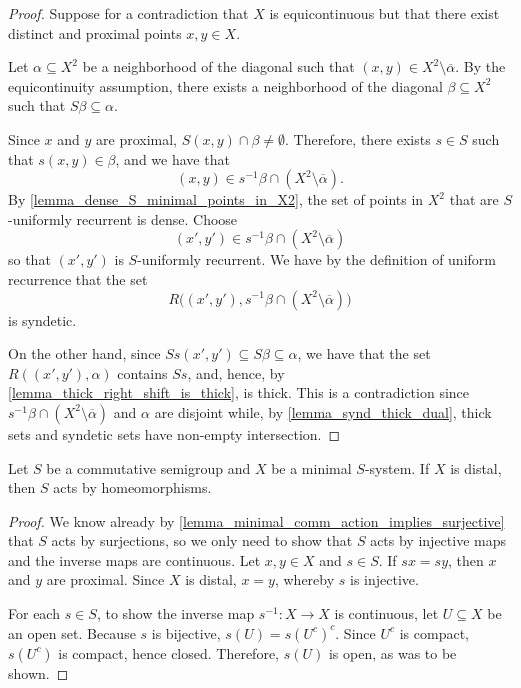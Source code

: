 \begin{proof}
    Suppose for a contradiction that $X$ is equicontinuous but that there exist distinct and proximal points $x, y \in X$.
    
    Let $\alpha \subseteq X^2$ be a neighborhood of the diagonal such that $(x,y) \in X^2 \setminus \overline{\alpha}$.  By the equicontinuity assumption, there exists a neighborhood of the diagonal $\beta \subseteq X^2$ such that $S \beta \subseteq \alpha$.
    
    Since $x$ and $y$ are proximal, $S(x,y) \cap \beta \neq \emptyset$.  Therefore, there exists $s \in S$ such that $s(x,y) \in \beta$, and we have that
    \[(x,y) \in s^{-1} \beta \cap (X^2 \setminus \overline{\alpha}).\]
    By \cref{lemma_dense_S_minimal_points_in_X2}, the set of points in $X^2$ that are $S$-uniformly recurrent is dense. Choose
    \[(x',y') \in s^{-1} \beta \cap (X^2 \setminus \overline{\alpha})\]
    so that $(x',y')$ is $S$-uniformly recurrent.  We have by the definition of uniform recurrence that the set
    \[R\big((x',y'), s^{-1} \beta \cap (X^2 \setminus \overline{\alpha})\big)\]
    is syndetic.

    On the other hand, since $Ss(x',y') \subseteq  S\beta \subseteq \alpha$, we have that the set $R((x',y'), \alpha)$ contains $Ss$, and, hence, by \cref{lemma_thick_right_shift_is_thick}, is thick.  This is a contradiction since $s^{-1} \beta \cap (X^2 \setminus \overline{\alpha})$ and $\alpha$ are disjoint while, by \cref{lemma_synd_thick_dual}, thick sets and syndetic sets have non-empty intersection.
\end{proof}

\begin{lemma}
\label{lemma_distal_implies_homeo}
    Let $S$ be a commutative semigroup and $X$ be a minimal $S$-system.  If $X$ is distal, then $S$ acts by homeomorphisms.
\end{lemma}

\begin{proof}
    We know already by \cref{lemma_minimal_comm_action_implies_surjective} that $S$ acts by surjections, so we only need to show that $S$ acts by injective maps and the inverse maps are continuous. Let $x, y \in X$ and $s \in S$.  If $sx = sy$, then $x$ and $y$ are proximal.  Since $X$ is distal, $x = y$, whereby $s$ is injective. 

    For each $s \in S$, to show the inverse map $s^{-1} : X \to X$ is continuous, let $U \subseteq X$ be an open set. Because $s$ is bijective, $s (U) = s (U^c)^c.$
    Since $U^c$ is compact, $s(U^c)$ is compact, hence closed. Therefore, $s(U)$ is open, as was to be shown.
\end{proof}

